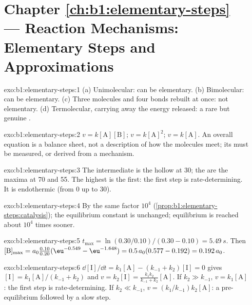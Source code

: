 \section*{Chapter \ref{ch:b1:elementary-steps} --- Reaction Mechanisms: Elementary Steps and Approximations}

\begin{solution}{exo:b1:elementary-steps:1}
(a) Unimolecular: can be elementary. (b) Bimolecular: can be elementary.
(c) Three molecules and four bonds rebuilt at once: not elementary.
(d) Termolecular,  carrying away the energy released: a rare but
genuine .
\end{solution}

\begin{solution}{exo:b1:elementary-steps:2}
$v = k[\mathrm{A}][\mathrm{B}]$; $v = k[\mathrm{A}]^2$; $v = k[\mathrm{A}]$.
An overall equation is a balance sheet, not a description of how the
molecules meet; its  must be measured, or derived from a
mechanism.
\end{solution}

\begin{solution}{exo:b1:elementary-steps:3}
The intermediate is the hollow at 30; the  are the
maxima at 70 and 55. The highest  is the first: the
first step is rate-determining. It is endothermic (from 0 up to 30).
\end{solution}

\begin{solution}{exo:b1:elementary-steps:4}
By the same factor $10^4$ (\cref{prop:b1:elementary-steps:catalysis}); the
equilibrium constant is unchanged; equilibrium is reached about $10^4$
times sooner.
\end{solution}

\begin{solution}{exo:b1:elementary-steps:5}
$t_{\max} = \ln(0.30/0.10)/(0.30 - 0.10) = \qty{5.49}{s}$. Then
$[\mathrm{B}]_{\max} = a_0\frac{0.10}{0.20}(\eu^{-0.549} - \eu^{-1.648}) =
0.5\,a_0(0.577 - 0.192) = 0.192\,a_0$.
\end{solution}

\begin{solution}{exo:b1:elementary-steps:6}
$\dd[\mathrm{I}]/\dd t = k_1[\mathrm{A}] - (k_{-1} + k_2)[\mathrm{I}] = 0$
gives $[\mathrm{I}] = k_1[\mathrm{A}]/(k_{-1} + k_2)$ and $v = k_2[\mathrm{I}]
= \frac{k_1k_2}{k_{-1}+k_2}[\mathrm{A}]$. If $k_2 \gg k_{-1}$, $v =
k_1[\mathrm{A}]$: the first step is rate-determining. If $k_2 \ll k_{-1}$,
$v = (k_1/k_{-1})k_2[\mathrm{A}]$: a pre-equilibrium followed by a slow
step.
\end{solution}

